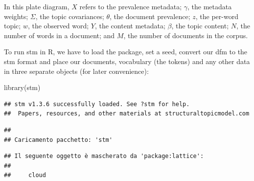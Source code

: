 \documentclass[
]{article}
\newenvironment{Shaded}{\begin{snugshade}}{\end{snugshade}}
\newcommand{\AttributeTok}[1]{\textcolor[rgb]{0.77,0.63,0.00}{#1}}
\newcommand{\DecValTok}[1]{\textcolor[rgb]{0.00,0.00,0.81}{#1}}
\newcommand{\FunctionTok}[1]{\textcolor[rgb]{0.00,0.00,0.00}{#1}}
\newcommand{\NormalTok}[1]{#1}
\newcommand{\OtherTok}[1]{\textcolor[rgb]{0.56,0.35,0.01}{#1}}
\newcommand{\SpecialCharTok}[1]{\textcolor[rgb]{0.00,0.00,0.00}{#1}}
\newcommand{\StringTok}[1]{\textcolor[rgb]{0.31,0.60,0.02}{#1}}
\begin{document}
In this plate diagram, \(X\) refers to the prevalence metadata; \(\gamma\), the metadata weights; \(\Sigma\), the topic covariances; \(\theta\), the document prevalence; \(z\), the per-word topic; \(w\), the observed word; \(Y\), the content metadata; \(\beta\), the topic content; \(N\), the number of words in a document; and \(M\), the number of documents in the corpus.

To run stm in R, we have to load the package, set a seed, convert our dfm to the stm format and place our documents, vocabulary (the tokens) and any other data in three separate objects (for later convenience):

\begin{Shaded}
\begin{Highlighting}[]
\FunctionTok{library}\NormalTok{(stm)}
\end{Highlighting}
\end{Shaded}

\begin{verbatim}
## stm v1.3.6 successfully loaded. See ?stm for help. 
##  Papers, resources, and other materials at structuraltopicmodel.com
\end{verbatim}

\begin{verbatim}
## 
## Caricamento pacchetto: 'stm'
\end{verbatim}

\begin{verbatim}
## Il seguente oggetto è mascherato da 'package:lattice':
## 
##     cloud
\end{verbatim}

\begin{Shaded}
\end{Shaded}
\end{document}
